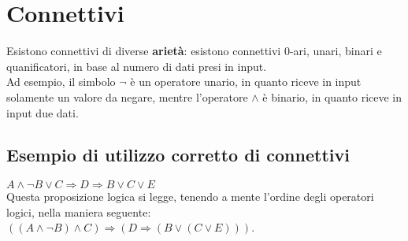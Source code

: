 \documentclass[12pt]{article}
\begin{document}
\section{Connettivi}
Esistono connettivi di diverse \textbf{arietà}: esistono connettivi 0-ari, unari, binari e quanificatori, in base al numero di dati presi in input.\\
Ad esempio, il simbolo $\neg$ è un operatore unario, in quanto riceve in input solamente un valore da negare, mentre l'operatore $\land$ è binario, in quanto riceve in input due dati.
\subsection*{Esempio di utilizzo corretto di connettivi}
$A \land \neg B \lor C \Rightarrow D \Rightarrow B \lor C \lor E$\\
Questa proposizione logica si legge, tenendo a mente l'ordine degli operatori logici, nella maniera seguente:\\
$((A \land \neg B) \land C) \Rightarrow (D \Rightarrow (B \lor (C \lor E)))$.
\end{document}
